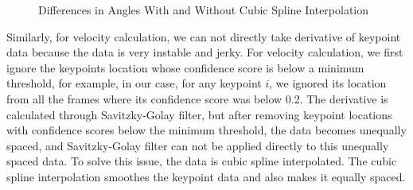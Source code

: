 \begin{figure}
 \quad 
  \caption{Differences in Angles With and Without Cubic Spline Interpolation} 
  \centering
  \label{fig:anglesInterpolation}
\end{figure}

Similarly, for velocity calculation, we can not directly take derivative of keypoint data because the data is very instable and jerky. For velocity calculation, we first ignore the keypoints location whose confidence score is below a minimum threshold, for example, in our case, for any keypoint $i$, we ignored its location from all the frames where its confidence score was below 0.2. The derivative is calculated through Savitzky-Golay filter, but after removing keypoint locations with confidence scores below the minimum threshold, the data becomes unequally spaced, and Savitzky-Golay filter can not be applied directly to this unequally spaced data. To solve this issue, the data is cubic spline interpolated. The cubic spline interpolation smoothes the keypoint data and also makes it equally spaced. 

